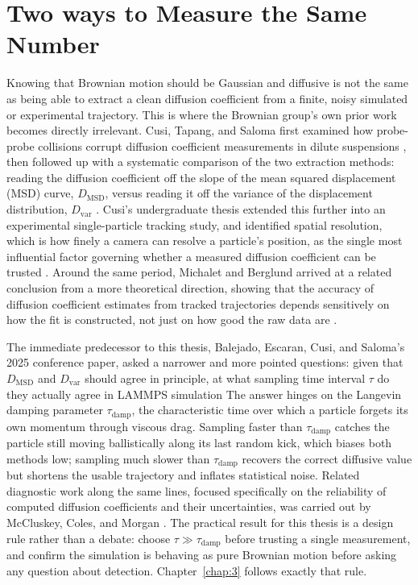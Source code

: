 \section{Two ways to Measure the Same Number}
\label{sec:2.2}
\hspace{\parindent} Knowing that Brownian motion should be Gaussian and diffusive is not the same as being able to extract a clean diffusion coefficient from a finite, noisy simulated or experimental trajectory. This is where the Brownian group's own prior work becomes directly irrelevant. Cusi, Tapang, and Saloma first examined how probe-probe collisions corrupt diffusion coefficient measurements in dilute suspensions \cite{Cusi2018}, then followed up with a systematic comparison of the two extraction methods: reading the diffusion coefficient off the slope of the mean squared displacement (MSD) curve, $D_\text{MSD}$, versus reading it off the variance of the displacement distribution, $D_\text{var}$ \cite{Cusi2020}. Cusi's undergraduate thesis extended this further into an experimental single-particle tracking study, and identified spatial resolution, which is how finely a camera can resolve a particle's position, as the single most influential factor governing whether a measured diffusion coefficient can be trusted \cite{Cusi2020Thesis}. Around the same period, Michalet and Berglund arrived at a related conclusion from a more theoretical direction, showing that the accuracy of diffusion coefficient estimates from tracked trajectories depends sensitively on how the fit is constructed, not just on how good the raw data are \cite{Michalet2012}.

\hspace{\parindent} The immediate predecessor to this thesis, Balejado, Escaran, Cusi, and Saloma's 2025 conference paper, asked a narrower and more pointed questions: given that $D_\text{MSD}$ and $D_\text{var}$ should agree in principle, at what sampling time interval $\tau$ do they actually agree in LAMMPS simulation \cite{balejado2025} The answer hinges on the Langevin damping parameter $\tau_\text{damp}$, the characteristic time over which a particle forgets its own momentum through viscous drag. Sampling faster than $\tau_\text{damp}$ catches the particle still moving ballistically along its last random kick, which biases both methods low; sampling much slower than $\tau_\text{damp}$ recovers the correct diffusive value but shortens the usable trajectory and inflates statistical noise. Related diagnostic work along the same lines, focused specifically on the reliability of computed diffusion coefficients and their uncertainties, was carried out by McCluskey, Coles, and Morgan \cite{McCluskey2023}. The practical result for this thesis is a design rule rather than a debate: choose $\tau \gg \tau_\text{damp}$ before trusting a single measurement, and confirm the simulation is behaving as pure Brownian motion before asking any question about detection. Chapter~\ref{chap:3} follows exactly that rule.



